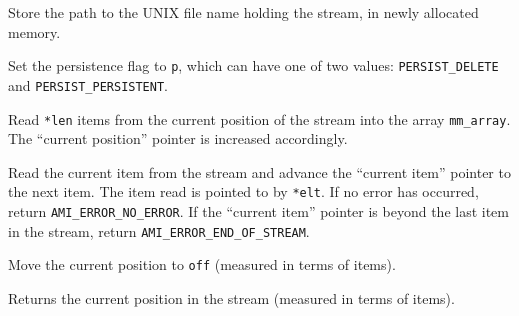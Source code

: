    {Store the path
  to the UNIX file name holding the stream, in newly allocated
  memory.}

   {Set the persistence flag
  to \lstinline|p|, which can have one of two values:
  \lstinline|PERSIST_DELETE| and \lstinline|PERSIST_PERSISTENT|.}
  
  {Read
  \lstinline|*len| items from the current position of the stream into
  the array \lstinline|mm_array|. The ``current position'' pointer is
  increased accordingly.  }  

  {Read the current item from the
  stream and advance the ``current item'' pointer to the next item.
  The item read is pointed to by \lstinline|*elt|. If no error has
  occurred, return \lstinline|AMI_ERROR_NO_ERROR|. If the ``current
  item'' pointer is beyond the last item in the stream, return
  \lstinline|AMI_ERROR_END_OF_STREAM|.}  
    
  {Move the current position to \lstinline|off| (measured in
  terms of items).}

  {Returns the current position in the stream
  (measured in terms of items).}  
    

